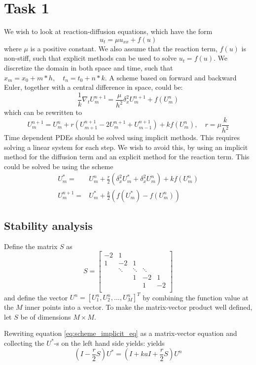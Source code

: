\section{Task 1}
We wish to look at reaction-diffusion equations, which have the form
$$ u_t = \mu u_{xx} + f(u)$$
where $\mu$ is a positive constant. We also assume that the reaction term, $f(u)$ is non-stiff, such that explicit methods can be used to solve $u_t = f(u)$.
We discretize the domain in both space and time, such that $x_m = x_0 + m*h, \quad t_n = t_0 + n*k$.
A scheme based on forward and backward Euler, together with a central difference in space, could be:
$$ \frac{1}{k}\nabla_tU_{m}^{n+1}=\frac{\mu}{h^2}\delta_x^2U_{m}^{n+1}+f(U_{m}^{n} )$$
which can be rewritten to 
$$U_{m}^{n+1} = U_{m}^{n} + r (U_{m+1}^{n+1}-2U_{m}^{n+1}+U_{m-1}^{n+1}) + kf(U_{m}^{n}), \quad r = \mu\frac{k}{h^2}$$
Time dependent PDEs should be solved using implicit methods. This requires solving a linear system for each step. We wish to avoid this, by using an implicit method for the diffusion term and an explicit method for the reaction term.
This could be solved be using the scheme
\begin{align}
  \label{eq:scheme_implicit_eq}
    U_{m}^{*} =& U_{m}^{n} +\frac{r}{2}(\delta_x^2 U_{m}^{*} + \delta_x^2 U_{m}^{n} ) + kf(U_{m}^{n}) \\
  \label{eq:scheme_explicit_eq}
    U_{m}^{n+1} =& U_{m}^{*} + \frac{k}{2}(f(U_{m}^{*}) - f(U_{m}^{n}))
\end{align}

\subsection{Stability analysis}

Define the matrix \( S \) as
\[
  S = 
  \begin{bmatrix}
  -2 & 1 &  &  & \\
   1& -2 & 1 &  & \\
   & \ddots & \ddots & \ddots & \\
   &  & 1 & -2 & 1\\
   &  &  & 1 & -2\\
  \end{bmatrix}
\]
and define the vector \( U^n = [U_1^n, U_2^n, \dots, U_M^n]^T \)
by combining the function value at the \( M \) inner points into a vector.
To make the matrix-vector product well defined, let \( S \) be of dimensions
\( M \times M \).

Rewriting equation \ref{eq:scheme_implicit_eq} as a matrix-vector equation
and collecting the \( U^* \)-s on the left hand side yields:
yields
\begin{equation}
  (I - \frac{r}{2}S)U^* = (I + kaI + \frac{r}{2}S) U^n
\end{equation}

